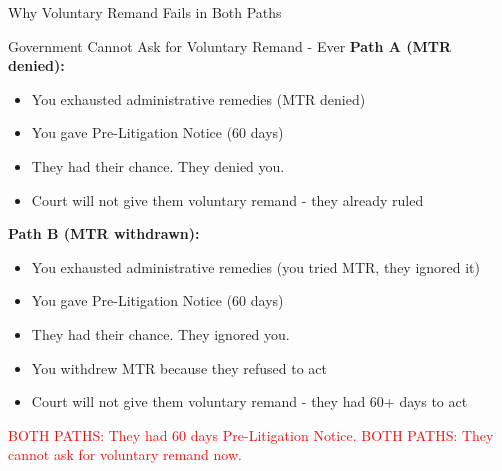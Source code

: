\documentclass[11pt]{beamer}
\begin{document}
	\begin{frame}{Why Voluntary Remand Fails in Both Paths}
		\scriptsize
		\begin{block}{Government Cannot Ask for Voluntary Remand - Ever}
			\textbf{Path A (MTR denied):}
			\begin{itemize}
				\item You exhausted administrative remedies (MTR denied)
				\item You gave Pre-Litigation Notice (60 days)
				\item They had their chance. They denied you.
				\item Court will not give them voluntary remand - they already ruled
			\end{itemize}
			\textbf{Path B (MTR withdrawn):}
			\begin{itemize}
				\item You exhausted administrative remedies (you tried MTR, they ignored it)
				\item You gave Pre-Litigation Notice (60 days)
				\item They had their chance. They ignored you.
				\item You withdrew MTR because they refused to act
				\item Court will not give them voluntary remand - they had 60+ days to act
			\end{itemize}
			\textcolor{red}{BOTH PATHS: They had 60 days Pre-Litigation Notice.}
			\textcolor{red}{BOTH PATHS: They cannot ask for voluntary remand now.}
		\end{block}
	\end{frame}
	
	
\end{document}
